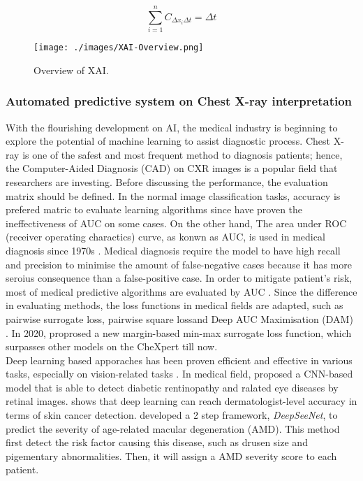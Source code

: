 \begin{equation} \label{eq: summation-to-delta}
    \sum_{i=1}^{n} C_{\Delta x_{i} \Delta t} = \Delta t
\end{equation}

\begin{figure}[!h]
    \centering
    \texttt{[image: ./images/XAI-Overview.png]}
    \caption{Overview of XAI. \citet{Belle2020XAIPriciples}}
    \label{fig: XAI_Overview}
\end{figure}

\subsubsection{Automated predictive system on Chest X-ray interpretation}

With the flourishing development on AI, the medical industry is beginning to explore the potential of machine learning to assist diagnostic  process. Chest X-ray is one of the safest and most frequent method to diagnosis patients; hence, the Computer-Aided Diagnosis (CAD) on CXR images is a popular field that researchers are investing. Before discussing the performance, the evaluation matrix should be defined. In the normal image classification tasks, accuracy is prefered matric to evaluate learning algorithms since \citep{Lobo2008AUDIsWrong} have proven the ineffectiveness of AUC on some cases. On the other hand, The area under ROC (receiver operating charactics) curve, as konwn as AUC, is used in medical diagnosis since 1970s \citep{Huang2005AUC}. Medical diagnosis require the model to have high recall and precision to minimise the amount of false-negative cases because it has more seroius consequence than a false-positive case. In order to mitigate patient's risk, most of medical predictive algorithms are evaluated by AUC \citep{HajianTilaki2013AUDOnMedical}. Since the difference in evaluating methods, the loss functions in medical fields are adapted, such as pairwise surrogate loss\citep{Gao2012SSurrogatelossAUC}, pairwise square loss\citep{Gao2013AUCSquareLoss}and Deep AUC Maximisation (DAM) \citep{Sulam2017MaximizingAUD}. In 2020, \citet{Yuan2020DAM} proprosed a new margin-based min-max surrogate loss function, which surpasses other models on the CheXpert\citep{Irvin2019Chexpert} till now. \\

Deep learning based apporaches has been proven efficient and effective in various tasks, especially on vision-related tasks \citep{Singh2020ExplainableMedicalImage}. In medical field, \citep{Ting2017DLOnEyeDisease} proposed a CNN-based model that is able to detect diabetic rentinopathy and ralated eye diseases by retinal images. \citet{Esteva2017DNNSkinCancer} shows that deep learning can reach dermatologist-level accuracy in terms of skin cancer detection. \citet{Peng2019DeepSeeNet} developed a 2 step framework, \textit{DeepSeeNet}, to predict the severity of age-related macular degeneration (AMD). This method first detect the risk factor causing this disease, such as drusen size and pigementary abnormalities. Then, it will assign a AMD severity score to each patient.

